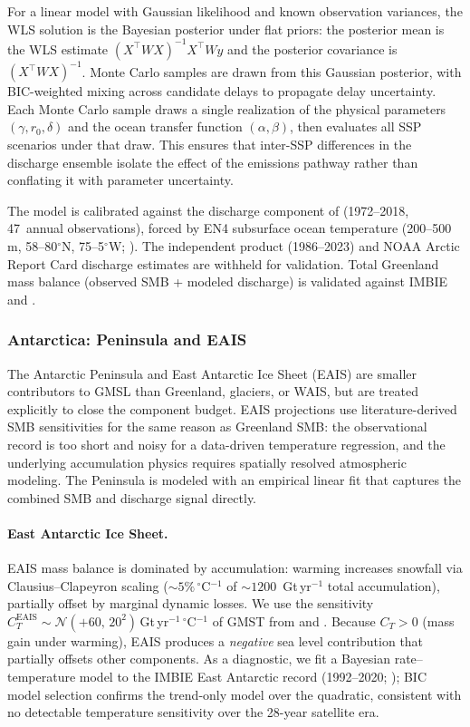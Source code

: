 \documentclass[11pt]{article}
\begin{document}
For a linear model with Gaussian likelihood and known observation variances, the WLS solution is the Bayesian posterior under flat priors: the posterior mean is the WLS estimate $(X^\top W X)^{-1} X^\top W y$ and the posterior covariance is $(X^\top W X)^{-1}$. Monte Carlo samples are drawn from this Gaussian posterior, with BIC-weighted mixing across candidate delays to propagate delay uncertainty. Each Monte Carlo sample draws a single realization of the physical parameters $(\gamma, r_0, \delta)$ and the ocean transfer function $(\alpha, \beta)$, then evaluates all SSP scenarios under that draw. This ensures that inter-SSP differences in the discharge ensemble isolate the effect of the emissions pathway rather than conflating it with parameter uncertainty.

The model is calibrated against the discharge component of \citet{Mouginot2019} (1972--2018, 47~annual observations), forced by EN4 subsurface ocean temperature (200--500\,m, 58--80$^\circ$N, 75--5$^\circ$W; \citealp{Straneo2013}). The independent \citet{Mankoff2021} product (1986--2023) and NOAA Arctic Report Card discharge estimates \citep{Moon2024, Moon2025} are withheld for validation. Total Greenland mass balance (observed SMB + modeled discharge) is validated against IMBIE \citep{Otosaka2023} and \citet{Horwath2022}.

	\subsubsection{Antarctica: Peninsula and EAIS}

The Antarctic Peninsula and East Antarctic Ice Sheet (EAIS) are smaller contributors to GMSL than Greenland, glaciers, or WAIS, but are treated explicitly to close the component budget. EAIS projections use literature-derived SMB sensitivities for the same reason as Greenland SMB: the observational record is too short and noisy for a data-driven temperature regression, and the underlying accumulation physics requires spatially resolved atmospheric modeling. The Peninsula is modeled with an empirical linear fit that captures the combined SMB and discharge signal directly.

\paragraph{East Antarctic Ice Sheet.}
EAIS mass balance is dominated by accumulation: warming increases snowfall via Clausius--Clapeyron scaling ($\sim\!5\%\,^\circ$C$^{-1}$ of $\sim\!1200$~Gt\,yr$^{-1}$ total accumulation), partially offset by marginal dynamic losses. We use the sensitivity $C_T^{\mathrm{EAIS}} \sim \mathcal{N}(+60,\, 20^2)$\,Gt\,yr$^{-1}$\,$^\circ$C$^{-1}$ of GMST from \citet{Frieler2015} and \citet{Ligtenberg2013}. Because $C_T > 0$ (mass gain under warming), EAIS produces a \emph{negative} sea level contribution that partially offsets other components. As a diagnostic, we fit a Bayesian rate--temperature model to the IMBIE East Antarctic record (1992--2020; \citealp{Otosaka2023}); BIC model selection confirms the trend-only model over the quadratic, consistent with no detectable temperature sensitivity over the 28-year satellite era.
\end{document}
